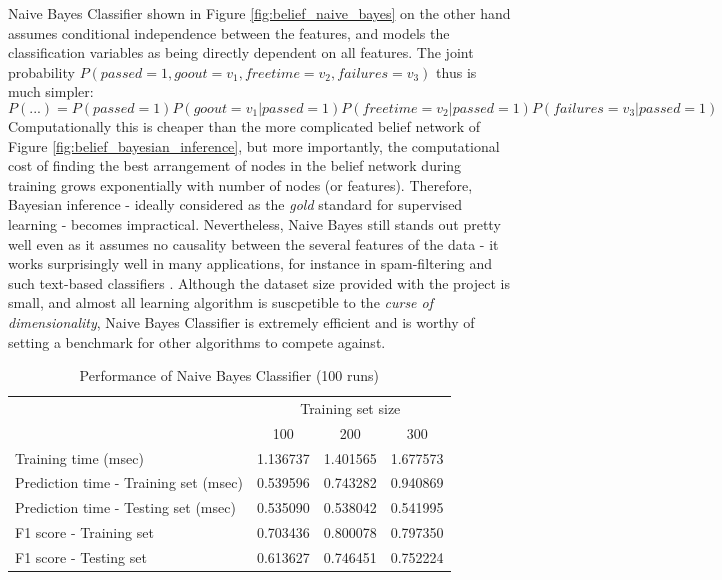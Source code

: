 \documentclass{article}
\begin{document}
	Naive Bayes Classifier shown in Figure \ref{fig:belief_naive_bayes} on the other hand assumes conditional independence between the features, and models the classification variables as being directly dependent on all features. The joint probability $P(passed=1, goout=v_1, freetime=v_2, failures=v_3)$ thus is much simpler: \[P(...) = P(passed=1)P(goout=v_1|passed=1)P(freetime=v_2|passed=1)P(failures=v_3|passed=1)\] 
	Computationally this is cheaper than the more complicated belief network of Figure \ref{fig:belief_bayesian_inference}, but more importantly, the computational cost of finding the best arrangement of nodes in the belief network during training grows exponentially with number of nodes (or features). Therefore, Bayesian inference - ideally considered as the \emph{gold} standard for supervised learning - becomes impractical. Nevertheless, Naive Bayes still stands out pretty well even as it assumes no causality between the several features of the data - it works surprisingly well in many applications, for instance in spam-filtering and such text-based classifiers \cite{Metsis06}. Although the dataset size provided with the project is small, and almost all learning algorithm is suscpetible to the \emph{curse of dimensionality}, Naive Bayes Classifier is extremely efficient and is worthy of setting a benchmark for other algorithms to compete against.

	\begin{table}[h]
		\centering
		\begin{tabular}{l|ccc}
			\toprule
			{} & \multicolumn{3}{c}{Training set size} \\
			{} &       100 &       200 &       300 \\
			\midrule
			Training time (msec)                  &  1.136737 &  1.401565 &  1.677573 \\
			Prediction time - Training set (msec) &  0.539596 &  0.743282 &  0.940869 \\
			Prediction time - Testing set (msec)  &  0.535090 &  0.538042 &  0.541995 \\
			F1 score - Training set               &  0.703436 &  0.800078 &  0.797350 \\
			F1 score - Testing set                &  0.613627 &  0.746451 &  0.752224 \\
			\bottomrule
		\end{tabular}
		\caption{Performance of Naive Bayes Classifier (100 runs)}
		\label{tab:naive_bayes_100}
	\end{table}
	        
\end{document}
